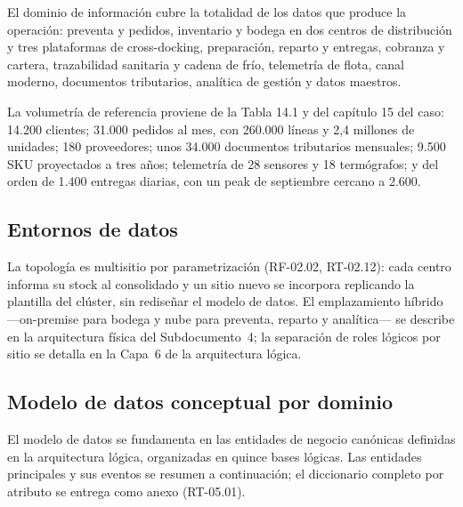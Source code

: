 El dominio de información cubre la totalidad de los datos que produce la
operación: preventa y pedidos, inventario y bodega en dos centros de
distribución y tres plataformas de cross-docking, preparación, reparto y
entregas, cobranza y cartera, trazabilidad sanitaria y cadena de frío,
telemetría de flota, canal moderno, documentos tributarios, analítica de
gestión y datos maestros.

La volumetría de referencia proviene de la Tabla 14.1 y del capítulo 15 del
caso: 14.200 clientes; 31.000 pedidos al mes, con 260.000 líneas y 2,4
millones de unidades; 180 proveedores; unos 34.000 documentos tributarios
mensuales; 9.500 SKU proyectados a tres años; telemetría de 28 sensores y 18
termógrafos; y del orden de 1.400 entregas diarias, con un peak de septiembre
cercano a 2.600.


\subsection{Entornos de datos}
\label{sec:entornos-datos}


La topología es multisitio por parametrización (RF-02.02, RT-02.12): cada
centro informa su stock al consolidado y un sitio nuevo se incorpora
replicando la plantilla del clúster, sin rediseñar el modelo de datos.  El
emplazamiento híbrido ---on-premise para bodega y nube para preventa, reparto
y analítica--- se describe en la arquitectura física del Subdocumento~4; la
separación de roles lógicos por sitio se detalla en la Capa~6 de la
arquitectura lógica.

\subsection{Modelo de datos conceptual por dominio}
\label{sec:modelo-conceptual}

El modelo de datos se fundamenta en las entidades de negocio canónicas
definidas en la arquitectura lógica, organizadas en quince bases lógicas.
Las entidades principales y sus eventos se resumen a continuación; el
diccionario completo por atributo se entrega como anexo (RT-05.01).

